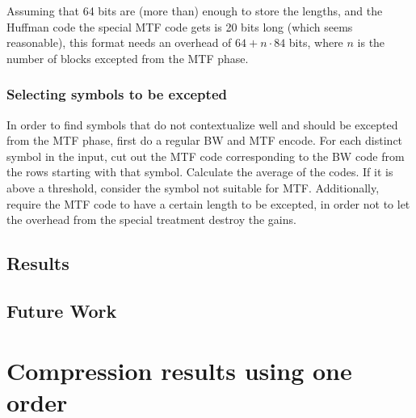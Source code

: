 \documentclass[a4paper]{scrreprt}
\begin{document}
Assuming that 64 bits are (more than) enough to store the lengths, and the
Huffman code the special MTF code gets is 20 bits long (which seems reasonable),
this format needs an overhead of \(64 + n \cdot 84\) bits, where \(n\) is the
number of blocks excepted from the MTF phase.

\subsection{Selecting symbols to be excepted}

In order to find symbols that do not contextualize well and should be excepted
from the MTF phase, first do a regular BW and MTF encode. For each distinct
symbol in the input, cut out the MTF code corresponding to the BW code from the
rows starting with that symbol. Calculate the average of the codes. If it is
above a threshold, consider the symbol not suitable for MTF. Additionally,
require the MTF code to have a certain length to be excepted, in order not to
let the overhead from the special treatment destroy the gains.

\section{Results}
\section{Future Work}


\appendix

\chapter{Compression results using one order}
\label{app:resultsoneorder}
\end{document}
